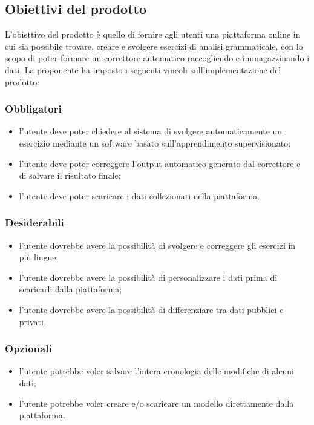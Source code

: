 \subsection{Obiettivi del prodotto}
	L'obiettivo del prodotto è quello di fornire agli utenti una piattaforma online in cui sia possibile trovare, creare e svolgere esercizi di analisi grammaticale, con lo scopo di poter formare un correttore automatico raccogliendo e immagazzinando i dati. 
La proponente ha imposto i seguenti vincoli sull'implementazione del prodotto:

\subsubsection{Obbligatori}
\begin{itemize}
	\item l'utente deve poter chiedere al sistema di svolgere automaticamente un esercizio mediante un software basato sull'apprendimento supervisionato;
	\item l'utente deve poter correggere l'output automatico generato dal correttore e di salvare il risultato finale;
	\item l'utente deve poter scaricare i dati collezionati nella piattaforma.
\end{itemize}
\subsubsection{Desiderabili}
\begin{itemize}
	\item l'utente dovrebbe avere la possibilità di svolgere e correggere gli esercizi in più lingue;
	\item l'utente dovrebbe avere la possibilità di personalizzare i dati prima di scaricarli dalla piattaforma;
	\item l'utente dovrebbe avere la possibilità di differenziare tra dati pubblici e privati.
\end{itemize}
\subsubsection{Opzionali}
\begin{itemize}
	\item l'utente potrebbe voler salvare l'intera cronologia delle modifiche di alcuni dati;
	\item l'utente potrebbe voler creare e/o scaricare un modello direttamente dalla piattaforma.
\end{itemize}

